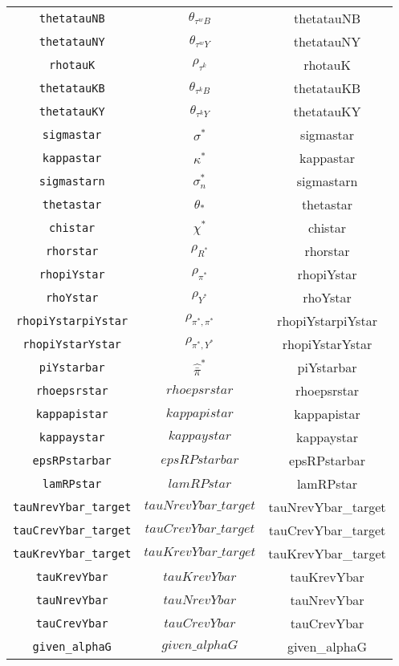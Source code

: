 \begin{center}
\begin{longtable}{ccc}
\texttt{thetatauNB} & $\theta_{\tau^wB}$ & thetatauNB\\
\texttt{thetatauNY} & $\theta_{\tau^wY}$ & thetatauNY\\
\texttt{rhotauK} & $\rho_{\tau^k}$ & rhotauK\\
\texttt{thetatauKB} & $\theta_{\tau^kB}$ & thetatauKB\\
\texttt{thetatauKY} & $\theta_{\tau^kY}$ & thetatauKY\\
\texttt{sigmastar} & $\sigma^*$ & sigmastar\\
\texttt{kappastar} & $\kappa^*$ & kappastar\\
\texttt{sigmastarn} & $\sigma^*_n$ & sigmastarn\\
\texttt{thetastar} & $\theta_*$ & thetastar\\
\texttt{chistar} & $\chi^*$ & chistar\\
\texttt{rhorstar} & ${\rho_{R^*}}$ & rhorstar\\
\texttt{rhopiYstar} & ${\rho_{\pi^*}}$ & rhopiYstar\\
\texttt{rhoYstar} & ${\rho_{Y^*}}$ & rhoYstar\\
\texttt{rhopiYstarpiYstar} & ${\rho_{\pi^*,\pi^*}}$ & rhopiYstarpiYstar\\
\texttt{rhopiYstarYstar} & ${\rho_{\pi^*,Y^*}}$ & rhopiYstarYstar\\
\texttt{piYstarbar} & $\hat{\bar{\pi}}^*$ & piYstarbar\\
\texttt{rhoepsrstar} & $rhoepsrstar$ & rhoepsrstar\\
\texttt{kappapistar} & $kappapistar$ & kappapistar\\
\texttt{kappaystar} & $kappaystar$ & kappaystar\\
\texttt{epsRPstarbar} & $epsRPstarbar$ & epsRPstarbar\\
\texttt{lamRPstar} & $lamRPstar$ & lamRPstar\\
\texttt{tauNrevYbar\_target} & $tauNrevYbar\_target$ & tauNrevYbar\_target\\
\texttt{tauCrevYbar\_target} & $tauCrevYbar\_target$ & tauCrevYbar\_target\\
\texttt{tauKrevYbar\_target} & $tauKrevYbar\_target$ & tauKrevYbar\_target\\
\texttt{tauKrevYbar} & $tauKrevYbar$ & tauKrevYbar\\
\texttt{tauNrevYbar} & $tauNrevYbar$ & tauNrevYbar\\
\texttt{tauCrevYbar} & $tauCrevYbar$ & tauCrevYbar\\
\texttt{given\_alphaG} & $given\_alphaG$ & given\_alphaG\\

\end{longtable}
\end{center}
